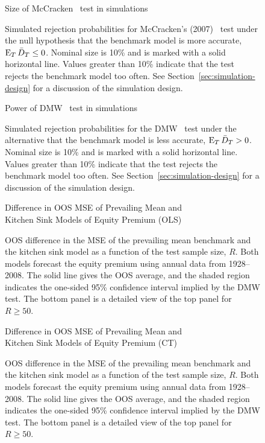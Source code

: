\documentclass[12pt]{article}
\begin{document}
\begin{figure}\centering
  {\large Size of McCracken \oost\ test in simulations}
  \caption{Simulated rejection probabilities for McCracken's (2007)
    \oost\ test under the null hypothesis that the benchmark model is
    more accurate, $\operatorname{E}_T \bar{D}_{T} \leq 0$. Nominal size is 10\% and is
    marked with a solid horizontal line. Values greater than 10\%
    indicate that the test rejects the benchmark model too often. See
    Section~\ref{sec:simulation-design} for a discussion of the
    simulation design.}
  \label{fig:mccracken}
\end{figure}
\clearpage

\begin{figure}\centering
  {\large Power of DMW \oost\ test in simulations}
  \caption{Simulated rejection probabilities for the DMW \oost\ test
    under the alternative that the benchmark model is less accurate,
    $\operatorname{E}_T \bar{D}_{T} > 0$. Nominal size is 10\% and is marked with a solid
    horizontal line. Values greater than 10\% indicate that the test
    rejects the benchmark model too often. See
    Section~\ref{sec:simulation-design} for a discussion of the
    simulation design.}
  \label{fig:ttest-power}
\end{figure}
\clearpage

\begin{figure}
\centering
\large{Difference in OOS MSE of Prevailing Mean and\\ Kitchen
    Sink Models of Equity Premium (OLS)}
\caption{OOS difference in the MSE
  of the prevailing mean benchmark and the kitchen sink model as a
  function of the test sample size, $R$.  Both models forecast the
  equity premium using annual data from 1928--2008.  The solid line
  gives the OOS average, and the shaded region indicates the
  one-sided 95\% confidence interval implied by the
  DMW test.  The bottom panel is a detailed view of the top
  panel for $R \geq 50$.}
\label{fig:empirics1}
\end{figure}
\clearpage

\begin{figure}
\centering
\large{Difference in OOS MSE of Prevailing Mean and\\ Kitchen
    Sink Models of Equity Premium (CT)}
\caption{OOS difference in the MSE
  of the prevailing mean benchmark and the kitchen sink model as a
  function of the test sample size, $R$.  Both models forecast the
  equity premium using annual data from 1928--2008.  The solid line
  gives the OOS average, and the shaded region indicates the
  one-sided 95\% confidence interval implied by the 
  DMW test.  The bottom panel is a detailed view of the top
  panel for $R \geq 50$.}
\label{fig:empirics2}
\end{figure}
\clearpage
\end{document}
